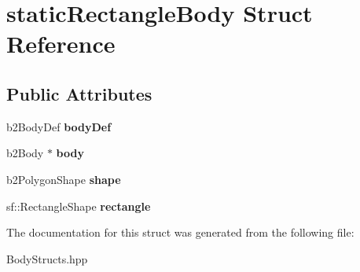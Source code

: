 \hypertarget{structstatic_rectangle_body}{\section{static\-Rectangle\-Body Struct Reference}
\label{structstatic_rectangle_body}
}
\subsection*{Public Attributes}
\begin{DoxyCompactItemize}
\item 
\hypertarget{structstatic_rectangle_body_a48e87e9482f138f97786ad3017b0b801}{b2\-Body\-Def {\bfseries body\-Def}}\label{structstatic_rectangle_body_a48e87e9482f138f97786ad3017b0b801}

\item 
\hypertarget{structstatic_rectangle_body_ab7a72fbd213aa720bf795fbeaf94fdbc}{b2\-Body $\ast$ {\bfseries body}}\label{structstatic_rectangle_body_ab7a72fbd213aa720bf795fbeaf94fdbc}

\item 
\hypertarget{structstatic_rectangle_body_ac786c29d811bd890e9aec2a9ca856d76}{b2\-Polygon\-Shape {\bfseries shape}}\label{structstatic_rectangle_body_ac786c29d811bd890e9aec2a9ca856d76}

\item 
\hypertarget{structstatic_rectangle_body_a4fad1dd8686ca44c36086662b54fb1fe}{sf\-::\-Rectangle\-Shape {\bfseries rectangle}}\label{structstatic_rectangle_body_a4fad1dd8686ca44c36086662b54fb1fe}

\end{DoxyCompactItemize}


The documentation for this struct was generated from the following file\-:\begin{DoxyCompactItemize}
\item 
Body\-Structs.\-hpp\end{DoxyCompactItemize}

